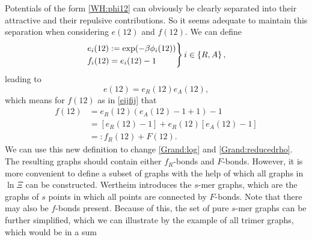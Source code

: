\documentclass[8.5pt,twoside,twocolumn]{article}
\theoremstyle{standard}
\begin{document}
Potentials of the form \eqref{WH:phi12} can obviously be clearly separated into their attractive
and their repulsive contributions. So it seems adequate to maintain this separation when considering 
$e(12)$ and $f(12)$. We can define
\begin{equation}
\begin{rcases}
e_i(12):=\exp(-\beta\phi_i(12)) \\
f_i(12)=e_i(12)-1
\end{rcases}
i \in \left\{{R,A} \right\},
\label{WH:eReA}
\end{equation} 
leading to
\begin{equation}
e(12)=e_R(12)e_A(12),
\label{WH:e12}
\end{equation}
which means for $f(12)$ as in \eqref{eijfij} that
\begin{equation}
\begin{aligned}
f(12)&=e_R(12)(e_A(12)-1+1)-1\\
&=[e_R(12)-1]+e_R(12)[e_A(12)-1] \\
&=:f_R(12)+F(12).
\end{aligned}
\label{WH:f12}
\end{equation}
We can use this new definition to change \eqref{Grand:log} and \eqref{Grand:reducedrho}. The resulting graphs
should contain either $f_R$-bonds and $F$-bonds. However, it is more convenient to define a subset of graphs
with the help of which all graphs in $\ln\Xi$ can be constructed. Wertheim introduces the $s$-mer graphs,
which are the graphs of $s$ points in which all points are connected by $F$-bonds. Note that there may also
be $f$-bonds present. Because of this, the set of pure $s$-mer graphs can be further simplified, which we
can illustrate by the example of all trimer graphs, which would be in a sum
\end{document}
